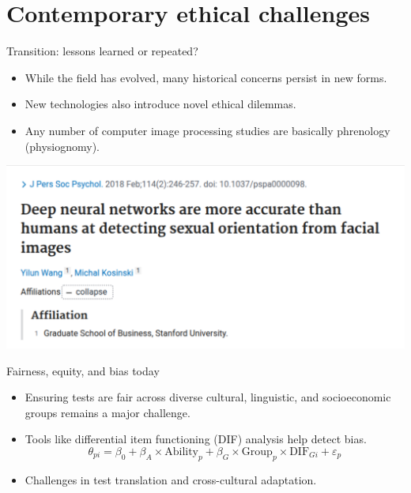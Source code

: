 \documentclass[aspectratio=169]{beamer}
\begin{document}
\section{Contemporary ethical challenges}

\begin{frame}{Transition: lessons learned or repeated?}
  \begin{itemize}
    \item While the field has evolved, many historical concerns persist in new forms.\pause
    \item New technologies also introduce novel ethical dilemmas.\pause
    \item Any number of computer image processing studies are basically phrenology (physiognomy).
  \end{itemize}
  \begin{center}
    \includegraphics[scale=.4]{../figures/kosinski.pdf}
  \end{center}
\end{frame}

\begin{frame}{Fairness, equity, and bias today}
  \begin{itemize}
    \item Ensuring tests are fair across diverse cultural, linguistic, and socioeconomic groups remains a major challenge.\pause
    \item Tools like differential item functioning (DIF) analysis help detect bias.
    $$\theta_{pi} = \beta_0 + \beta_A \times \text{Ability}_p + \beta_G \times \text{Group}_p \times \text{DIF}_{Gi} + \varepsilon_p$$\pause
    \item Challenges in test translation and cross-cultural adaptation.
  \end{itemize}
\end{frame}
\end{document}
